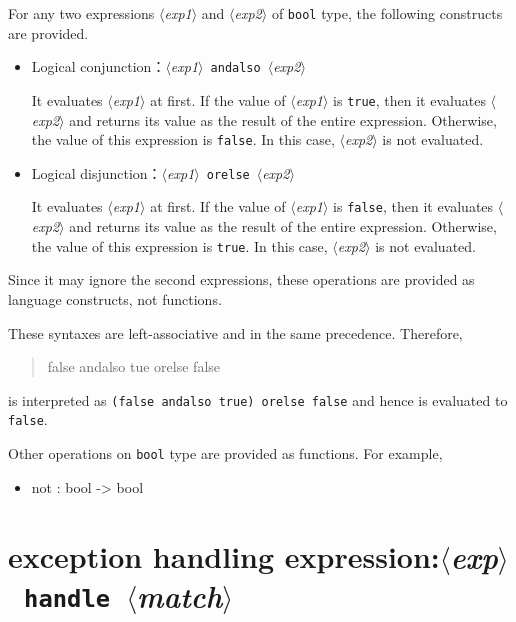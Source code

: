 \documentclass{jbook}
\newcommand{\txt}[2]{#2}
\newcommand{\code}[1]{\mbox{\large\tt #1}}
\newcommand{\nonterm}[1]{\mbox{$\langle$}{\it #1}\mbox{$\rangle$}}
\newcommand{\term}[1]{\mbox{{\tt #1}}}
\newenvironment{program}{\begin{quote}\begin{tt}}%
                        {\end{tt}\end{quote}}
\begin{document}
	For any two expressions \nonterm{exp1} and \nonterm{exp2} of 
\code{bool} type, the following constructs are provided.
\begin{itemize}
\item Logical conjunction：\nonterm{exp1}\ \term{andalso}\ \nonterm{exp2} 

	It evaluates \nonterm{exp1} at first.
	If the value of \nonterm{exp1} is \code{true}, then
it evaluates \nonterm{exp2} and returns its value as the result of
the entire expression.
	Otherwise, the value of this expression is \code{false}.
	In this case, \nonterm{exp2} is not evaluated.

\item Logical disjunction：\nonterm{exp1}\ \term{orelse}\ \nonterm{exp2}

	It evaluates \nonterm{exp1} at first.
	If the value of \nonterm{exp1} is \code{false}, then
it evaluates \nonterm{exp2} and returns its value as the result of
the entire expression.
	Otherwise, the value of this expression is \code{true}.
	In this case, \nonterm{exp2} is not evaluated.

\end{itemize}
	Since it may ignore the second expressions,
these operations are provided as language constructs, not functions.

	These syntaxes are left-associative and in the same
precedence.
	Therefore,
\begin{program}
false andalso tue orelse false
\end{program}
is interpreted as \code{(false andalso true) orelse false}
and hence is evaluated to \code{false}.

	Other operations on \code{bool} type are provided as
functions.
	For example,
\begin{itemize}
\item not : bool -> bool
\end{itemize}
\fi%


\section{\txt{例外処理式}{exception handling expression}:\nonterm{exp}\ \term{handle}\ \nonterm{match}}
\label{sec:expression:handle}
\end{document}
